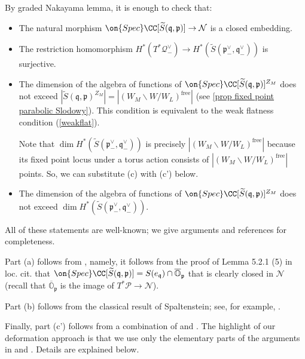 \documentclass[12pt]{amsart}
\begin{document}
By graded Nakayama lemma, it is enough to check that:
\begin{itemize}
    \item[(a)]  The natural morphism $\on{Spec}\CC[\widetilde{S}(\mathfrak{q},\mathfrak{p})] \rightarrow \mathcal{N}$ is a closed embedding. 
    \item[(b)] The restriction homomorphism $H^*(T^*\mathcal{Q}^\vee_-) \rightarrow H^*(\widetilde{S}(\mathfrak{p}^\vee_-,\mathfrak{q}^\vee_-))$ is surjective. 
    \item[(c)] The dimension of the algebra of functions of $\on{Spec}\CC[\widetilde{S}(\mathfrak{q},\mathfrak{p})]^{Z_M}$ does not exceed $|\widetilde{S}(\mathfrak{q},\mathfrak{p})^{Z_M}|=|(W_M\backslash W/W_L)^{\mathrm{free}}|$ (see \cref{prop fixed point parabolic Slodowy}). This condition is equivalent to the weak flatness condition (\ref{weakflat}).
    
    Note that $\dim H^*(\widetilde{S}(\mathfrak{p}^\vee_-,\mathfrak{q}^\vee_-))$ is precisely $|(W_M\backslash W/W_L)^{\mathrm{free}}|$ because its fixed point locus under a torus action consists of $|(W_M\backslash W/W_L)^{\mathrm{free}}|$ points. So, we can substitute (c) with (c') below.
    \item[(c')]The dimension of the algebra of functions of $\on{Spec}\CC[\widetilde{S}(\mathfrak{q},\mathfrak{p})]^{Z_M}$ does not exceed $\dim H^*(\widetilde{S}(\mathfrak{p}^\vee_-,\mathfrak{q}^\vee_-))$.
\end{itemize}

All of these statements are well-known; we give arguments and references for completeness. 

Part (a) follows from \cite[Lemma 5.2.1 (5)]{Losev_isofquant}, namely, it follows from the proof of Lemma 5.2.1 (5) in loc. cit. that $\on{Spec}\CC[\widetilde{S}(\mathfrak{q},\mathfrak{p})]=S(e_{\mathfrak{q}}) \cap \overline{\mathbb{O}}_{\mathfrak{p}}$ that is clearly closed in $\mathcal{N}$ (recall that $\overline{\mathbb{O}}_{\mathfrak{p}}$ is the image of $T^*\mathcal{P} \rightarrow \mathcal{N}$). %

Part (b) follows from the classical result of Spaltenstein; see, for example, \cite[Corollary 2.5]{bo}. 

Finally, part (c') follows from a combination of \cite[Theorem 1.1]{bo} and \cite[Appendix A]{Hikita}. The highlight of our deformation approach is that we use only the elementary parts of the arguments in \cite{bo} and \cite{Hikita}. Details are explained below.
\end{document}

